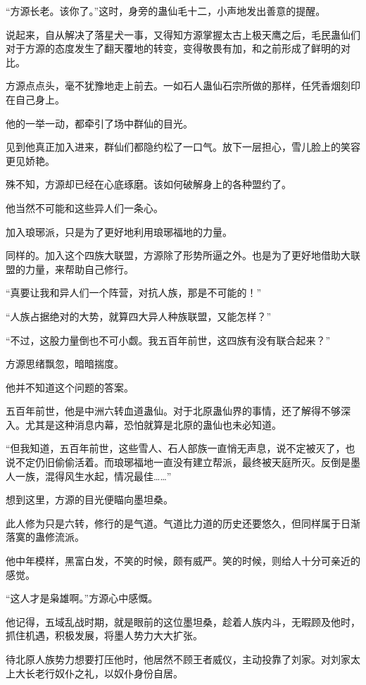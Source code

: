 \begin{this_body}
“方源长老。该你了。”这时，身旁的蛊仙毛十二，小声地发出善意的提醒。

说起来，自从解决了落星犬一事，又得知方源掌握太古上极天鹰之后，毛民蛊仙们对于方源的态度发生了翻天覆地的转变，变得敬畏有加，和之前形成了鲜明的对比。

方源点点头，毫不犹豫地走上前去。一如石人蛊仙石宗所做的那样，任凭香烟刻印在自己身上。

他的一举一动，都牵引了场中群仙的目光。

见到他真正加入进来，群仙们都隐约松了一口气。放下一层担心，雪儿脸上的笑容更见娇艳。

殊不知，方源却已经在心底琢磨。该如何破解身上的各种盟约了。

他当然不可能和这些异人们一条心。

加入琅琊派，只是为了更好地利用琅琊福地的力量。

同样的。加入这个四族大联盟，方源除了形势所逼之外。也是为了更好地借助大联盟的力量，来帮助自己修行。

“真要让我和异人们一个阵营，对抗人族，那是不可能的！”

“人族占据绝对的大势，就算四大异人种族联盟，又能怎样？”

“不过，这股力量倒也不可小觑。我五百年前世，这四族有没有联合起来？”

方源思绪飘忽，暗暗揣度。

他并不知道这个问题的答案。

五百年前世，他是中洲六转血道蛊仙。对于北原蛊仙界的事情，还了解得不够深入。尤其是这种消息内幕，恐怕就算是北原的蛊仙也未必知道。

“但我知道，五百年前世，这些雪人、石人部族一直悄无声息，说不定被灭了，也说不定仍旧偷偷活着。而琅琊福地一直没有建立帮派，最终被天庭所灭。反倒是墨人一族，混得风生水起，情况最佳……”

想到这里，方源的目光便瞄向墨坦桑。

此人修为只是六转，修行的是气道。气道比力道的历史还要悠久，但同样属于日渐落寞的蛊修流派。

他中年模样，黑富白发，不笑的时候，颇有威严。笑的时候，则给人十分可亲近的感觉。

“这人才是枭雄啊。”方源心中感慨。

他记得，五域乱战时期，就是眼前的这位墨坦桑，趁着人族内斗，无暇顾及他时，抓住机遇，积极发展，将墨人势力大大扩张。

待北原人族势力想要打压他时，他居然不顾王者威仪，主动投靠了刘家。对刘家太上大长老行奴仆之礼，以奴仆身份自居。


\end{this_body}
